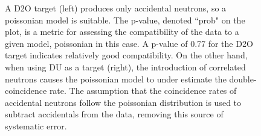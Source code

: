 \begin{figure}[htbp]
    \centering
    \caption{A D2O target (left) produces only accidental neutrons, so a poissonian model is suitable.
    The p-value, denoted ``prob" on the plot, is a metric for assessing the compatibility of the data to a given model, poissonian in this case.
    A p-value of 0.77 for the D2O target indicates relatively good compatibility.
    On the other hand, when using DU as a target (right), the introduction of correlated neutrons causes the poissonian model to under estimate the double-coincidence rate.
    The assumption that the coincidence rates of accidental neutrons follow the poissonian distribution is used to subtract accidentals from the data, removing this source of systematic error.}
    \label{fig:PoissonianFits}
\end{figure}


